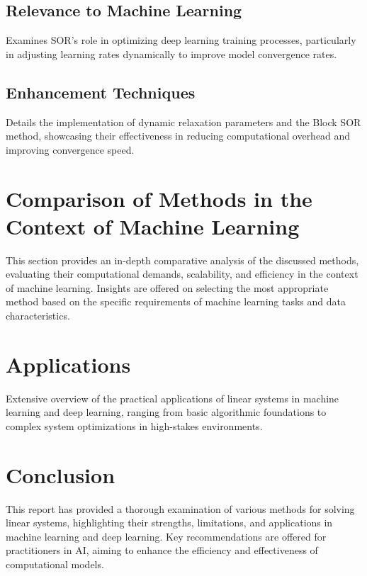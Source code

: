 \documentclass{article}
\begin{document}
\subsection{Relevance to Machine Learning}
Examines SOR’s role in optimizing deep learning training processes, particularly in adjusting learning rates dynamically to improve model convergence rates.

\subsection{Enhancement Techniques}
Details the implementation of dynamic relaxation parameters and the Block SOR method, showcasing their effectiveness in reducing computational overhead and improving convergence speed.

\section{Comparison of Methods in the Context of Machine Learning}
This section provides an in-depth comparative analysis of the discussed methods, evaluating their computational demands, scalability, and efficiency in the context of machine learning. Insights are offered on selecting the most appropriate method based on the specific requirements of machine learning tasks and data characteristics.

\section{Applications}
Extensive overview of the practical applications of linear systems in machine learning and deep learning, ranging from basic algorithmic foundations to complex system optimizations in high-stakes environments.

\section{Conclusion}
This report has provided a thorough examination of various methods for solving linear systems, highlighting their strengths, limitations, and applications in machine learning and deep learning. Key recommendations are offered for practitioners in AI, aiming to enhance the efficiency and effectiveness of computational models.



\end{document}
